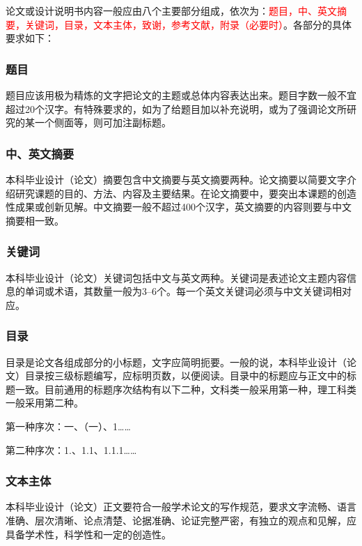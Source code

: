 \documentclass{HDU-Bachelor-Thesis}
\begin{document}
论文或设计说明书内容一般应由八个主要部分组成，依次为：\textcolor{red}{题目，中、英文摘要，关键词，目录，文本主体，致谢，参考文献，附录（必要时）}。各部分的具体要求如下：

\subsubsection{题目}

题目应该用极为精炼的文字把论文的主题或总体内容表达出来。题目字数一般不宜超过20个汉字。有特殊要求的，如为了给题目加以补充说明，或为了强调论文所研究的某一个侧面等，则可加注副标题。

\subsubsection{中、英文摘要}

本科毕业设计（论文）摘要包含中文摘要与英文摘要两种。论文摘要以简要文字介绍研究课题的目的、方法、内容及主要结果。在论文摘要中，要突出本课题的创造性成果或创新见解。中文摘要一般不超过400个汉字，英文摘要的内容则要与中文摘要相一致。

\subsubsection{关键词}

本科毕业设计（论文）关键词包括中文与英文两种。关键词是表述论文主题内容信息的单词或术语，其数量一般为3–6个。每一个英文关键词必须与中文关键词相对应。

\subsubsection{目录}

目录是论文各组成部分的小标题，文字应简明扼要。一般的说，本科毕业设计（论文）目录按三级标题编写，应标明页数，以便阅读。目录中的标题应与正文中的标题一致。目前通用的标题序次结构有以下二种，文科类一般采用第一种，理工科类一般采用第二种。

第一种序次：一、（一）、1……

第二种序次：1.、1.1、1.1.1……

\subsubsection{文本主体}

本科毕业设计（论文）正文要符合一般学术论文的写作规范，要求文字流畅、语言准确、层次清晰、论点清楚、论据准确、论证完整严密，有独立的观点和见解，应具备学术性，科学性和一定的创造性。
\end{document}
